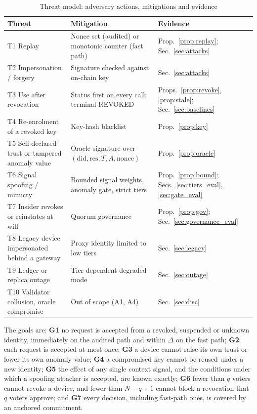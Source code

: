\begin{table}[t]
\centering
\caption{Threat model: adversary actions, mitigations and evidence}
\label{tab:threats}
\scriptsize
\begin{tabular}{@{}p{1.9cm}p{3.3cm}p{1.8cm}@{}}
\toprule
\textbf{Threat} & \textbf{Mitigation} & \textbf{Evidence} \\
\midrule
T1 Replay & Nonce set (audited) or monotonic counter (fast path) & Prop.~\ref{prop:replay}; Sec.~\ref{sec:attacks} \\
T2 Impersonation / forgery & Signature checked against on-chain key & Sec.~\ref{sec:attacks} \\
T3 Use after revocation & Status first on every call; terminal REVOKED & Props.~\ref{prop:revoke}, \ref{prop:stale}; Sec.~\ref{sec:baselines} \\
T4 Re-enrolment of a revoked key & Key-hash blacklist & Prop.~\ref{prop:key} \\
T5 Self-declared trust or tampered anomaly value & Oracle signature over $(\mathrm{did},\mathrm{res},T,A,\mathrm{nonce})$ & Prop.~\ref{prop:oracle} \\
T6 Signal spoofing / mimicry & Bounded signal weights, anomaly gate, strict tiers & Prop.~\ref{prop:bound}; Secs.~\ref{sec:tiers_eval}, \ref{sec:gate_eval} \\
T7 Insider revokes or reinstates at will & Quorum governance & Prop.~\ref{prop:gov}; Sec.~\ref{sec:governance_eval} \\
T8 Legacy device impersonated behind a gateway & Proxy identity limited to low tiers & Sec.~\ref{sec:legacy} \\
T9 Ledger or replica outage & Tier-dependent degraded mode & Sec.~\ref{sec:outage} \\
T10 Validator collusion, oracle compromise & Out of scope (A1, A4) & Sec.~\ref{sec:disc} \\
\bottomrule
\end{tabular}
\end{table}

The goals are: \textbf{G1} no request is accepted from a revoked, suspended or unknown identity, immediately on the audited path and within $\Delta$ on the fast path; \textbf{G2} each request is accepted at most once; \textbf{G3} a device cannot raise its own trust or lower its own anomaly value; \textbf{G4} a compromised key cannot be reused under a new identity; \textbf{G5} the effect of any single context signal, and the conditions under which a spoofing attacker is accepted, are known exactly; \textbf{G6} fewer than $q$ voters cannot revoke a device, and fewer than $N-q+1$ cannot block a revocation that $q$ voters approve; and \textbf{G7} every decision, including fast-path ones, is covered by an anchored commitment.
